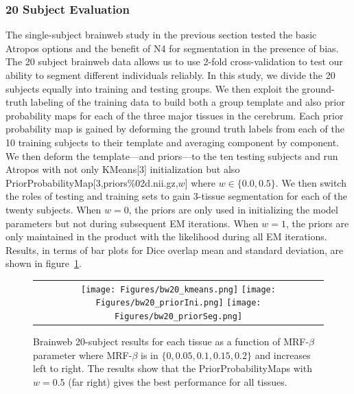 \documentclass[11pt,english]{article}
\begin{document}
\subsubsection{20 Subject Evaluation} The single-subject brainweb
study in the previous section tested the basic Atropos options and the
benefit of N4 for segmentation in the presence of bias.  The 20
subject brainweb data allows us to use 2-fold cross-validation to test
our ability to segment different individuals reliably.  In this study,
we divide the 20 subjects equally into training and testing groups.
We then exploit the ground-truth labeling of the training data to
build both a group template \citep{Avants2010} and also prior
probability maps for each of the three major tissues in the cerebrum.
Each prior probability map is gained by deforming the ground truth
labels from each of the 10 training subjects to their template and
averaging component by component.  We then deform the template---and
priors---to the ten testing subjects and run Atropos with not only
{\ttfamily KMeans[3]} initialization but also {\ttfamily
  PriorProbabilityMap[3,priors\%02d.nii.gz,$w$] } where $w \in
\{0.0,0.5\}$.  We then switch the roles of testing and training sets to
gain 3-tissue segmentation for each of the twenty subjects.  
When $w=0$, the priors are only used in initializing
the model parameters but not during subsequent EM iterations.  
When $w=1$, the priors are only maintained in the product with the
likelihood during all EM iterations.  Results, in terms of bar
plots for Dice overlap mean and standard deviation, are shown in figure~\ref{fig:bweb20}.
\begin{figure}
\begin{center}
\begin{tabular}{c}
\texttt{[image: Figures/bw20\_kmeans.png]}
\texttt{[image: Figures/bw20\_priorIni.png]}
\texttt{[image: Figures/bw20\_priorSeg.png]}
\end{tabular}
\caption{\baselineskip 12pt \small Brainweb 20-subject results for
  each tissue as a function of MRF-$\beta$ parameter where MRF-$\beta$
  is in $\{0,0.05,0.1,0.15,0.2\}$ and increases left to right.  The results show that the PriorProbabilityMaps with
  $w=0.5$ (far right) gives the best performance for all tissues.}
\label{fig:bweb20}
\end{center}
\end{figure}
\end{document}
